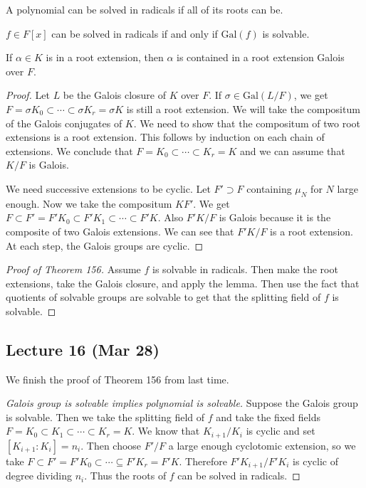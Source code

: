 \documentclass[10pt, twoside]{article}
\begin{document}
        \begin{defn}
            A polynomial can be solved in radicals if all of its roots can be.
        \end{defn}

        \begin{thm}
            $f \in F[x]$ can be solved in radicals if and only if $\mathrm{Gal}(f)$ is solvable.
        \end{thm}

        \begin{lem}
            If $\alpha \in K$ is in a root extension, then $\alpha$ is contained in a root extension Galois over $F$.
            \begin{proof}
                Let $L$ be the Galois closure of $K$ over $F$. If $\sigma \in \mathrm{Gal}(L/F)$, we get $F = \sigma K_0 \subset \cdots \subset \sigma K_r = \sigma K$ is still a root extension. We will take the compositum of the Galois conjugates of $K$. We need to show that the compositum of two root extensions is a root extension. This follows by induction on each chain of extensions. We conclude that $F = K_0 \subset \cdots \subset K_r = K$ and we can assume that $K/F$ is Galois.

                We need successive extensions to be cyclic. Let $F' \supset F$ containing $\mu_N$ for $N$ large enough. Now we take the compositum $KF'$. We get $F \subset F' = F'K_0 \subset F'K_1 \subset \cdots \subset F'K$. Also $F'K/F$ is Galois because it is the composite of two Galois extensions. We can see that $F'K/F$ is a root extension. At each step, the Galois groups are cyclic.
            \end{proof}
        \end{lem}

        \begin{proof}[Proof of Theorem 156]
            Assume $f$ is solvable in radicals. Then make the root extensions, take the Galois closure, and apply the lemma. Then use the fact that quotients of solvable groups are solvable to get that the splitting field of $f$ is solvable.
        \end{proof}

        \subsection{Lecture 16 (Mar 28)}
        We finish the proof of Theorem 156 from last time.

        \begin{proof}[Galois group is solvable implies polynomial is solvable]
            Suppose the Galois group is solvable. Then we take the splitting field of $f$ and take the fixed fields $F = K_0 \subset K_1 \subset \cdots \subset K_r = K$. We know that $K_{i+1}/K_i$ is cyclic and set $[K_{i+1}:K_i] = n_i$. Then choose $F'/F$ a large enough cyclotomic extension, so we take $F \subset F' = F'K_0 \subset \cdots \subseteq F'K_r = F'K$. Therefore $F'K_{i+1}/F'K_i$ is cyclic of degree dividing $n_i$. Thus the roots of $f$ can be solved in radicals.
        \end{proof}
\end{document}
